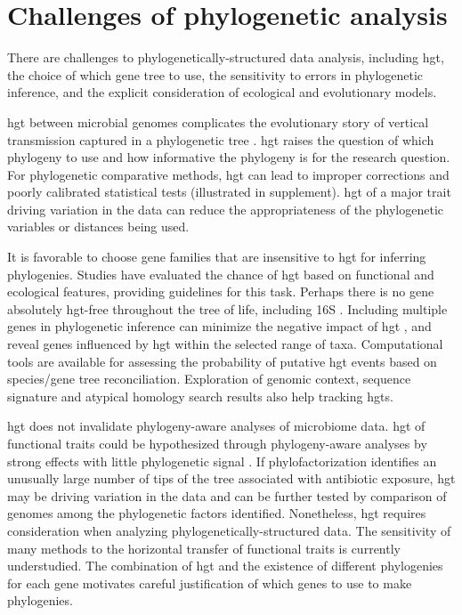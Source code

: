 \section{Challenges of phylogenetic analysis}
There are challenges to phylogenetically-structured data analysis, including \gls{hgt}, the choice of which gene tree to use, the sensitivity to errors in phylogenetic inference, and the explicit consideration of ecological and evolutionary models.\par
\gls{hgt} between microbial genomes complicates the evolutionary story of vertical transmission captured in a phylogenetic tree \cite{gogarten_hgt}. \gls{hgt} raises the question of which phylogeny to use and how informative the phylogeny is for the research question. For phylogenetic comparative methods, \gls{hgt} can lead to improper corrections and poorly calibrated statistical tests (illustrated in supplement). \gls{hgt} of a major trait driving variation in the data can reduce the appropriateness of the phylogenetic variables or distances being used.\par
It is favorable to choose gene families that are insensitive to \gls{hgt} for inferring phylogenies. Studies have evaluated the chance of \gls{hgt} based on functional and ecological features\cite{gogarten_hgt, complexity_hypothesis}, providing guidelines for this task. Perhaps there is no gene absolutely \gls{hgt}-free throughout the tree of life, including 16S \cite{kitahara_hgt}. Including multiple genes in phylogenetic inference can minimize the negative impact of \gls{hgt} \cite{phylophlan}, and reveal genes influenced by \gls{hgt} within the selected range of taxa\cite{purdom}. Computational tools are available for assessing the probability of putative \gls{hgt} events based on species/gene tree reconciliation\cite{Washburne2017-up}. Exploration of genomic context, sequence signature and atypical homology search results also help tracking \gls{hgt}s\cite{ravenhall_hgt}. \par
\gls{hgt} does not invalidate phylogeny-aware analyses of microbiome data. \gls{hgt} of functional traits could be hypothesized through phylogeny-aware analyses by strong effects with little phylogenetic signal \cite{lozupone_species_divergence}. If phylofactorization identifies an unusually large number of tips of the tree associated with antibiotic exposure, \gls{hgt} may be driving variation in the data and can be further tested by comparison of genomes among the phylogenetic factors identified. Nonetheless, \gls{hgt} requires consideration when analyzing phylogenetically-structured data. The sensitivity of many methods to the horizontal transfer of functional traits is currently understudied. The combination of \gls{hgt} and the existence of different phylogenies for each gene motivates careful justification of which genes to use to make phylogenies.
